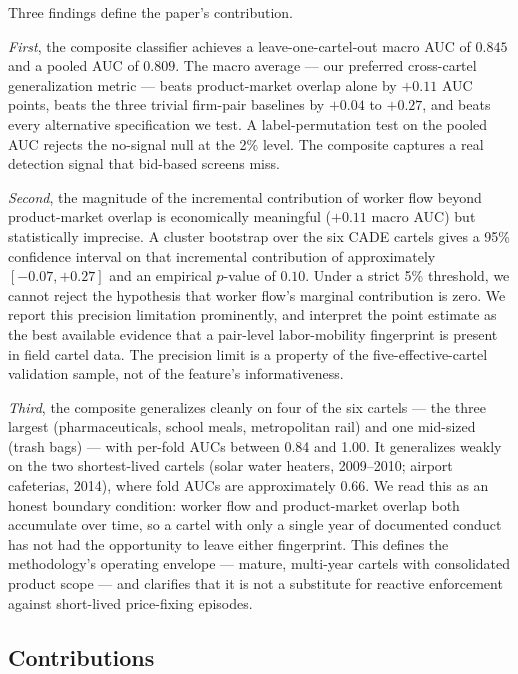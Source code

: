 Three findings define the paper's contribution.

\emph{First}, the composite classifier achieves a leave-one-cartel-out macro AUC of $\mathbf{0.845}$ and a pooled AUC of $\mathbf{0.809}$. The macro average --- our preferred cross-cartel generalization metric --- beats product-market overlap alone by $+0.11$ AUC points, beats the three trivial firm-pair baselines by $+0.04$ to $+0.27$, and beats every alternative specification we test. A label-permutation test on the pooled AUC rejects the no-signal null at the 2\% level. The composite captures a real detection signal that bid-based screens miss.

\emph{Second}, the magnitude of the incremental contribution of worker flow beyond product-market overlap is economically meaningful ($+0.11$ macro AUC) but statistically imprecise. A cluster bootstrap over the six CADE cartels gives a 95\% confidence interval on that incremental contribution of approximately $[-0.07, +0.27]$ and an empirical $p$-value of $0.10$. Under a strict 5\% threshold, we cannot reject the hypothesis that worker flow's marginal contribution is zero. We report this precision limitation prominently, and interpret the point estimate as the best available evidence that a pair-level labor-mobility fingerprint is present in field cartel data. The precision limit is a property of the five-effective-cartel validation sample, not of the feature's informativeness.

\emph{Third}, the composite generalizes cleanly on four of the six cartels --- the three largest (pharmaceuticals, school meals, metropolitan rail) and one mid-sized (trash bags) --- with per-fold AUCs between 0.84 and 1.00. It generalizes weakly on the two shortest-lived cartels (solar water heaters, 2009--2010; airport cafeterias, 2014), where fold AUCs are approximately 0.66. We read this as an honest boundary condition: worker flow and product-market overlap both accumulate over time, so a cartel with only a single year of documented conduct has not had the opportunity to leave either fingerprint. This defines the methodology's operating envelope --- mature, multi-year cartels with consolidated product scope --- and clarifies that it is not a substitute for reactive enforcement against short-lived price-fixing episodes.

\subsection*{Contributions}

